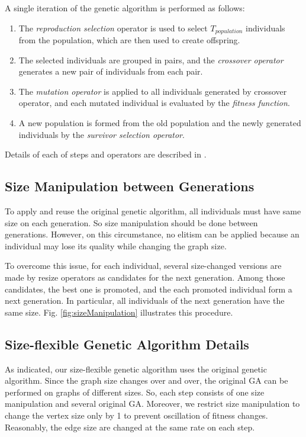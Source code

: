 \documentclass[a4paper, 10pt, conference]{ieeeconf}      %
\begin{document}
A single iteration of the genetic algorithm is performed as follows:

\begin{enumerate}
\item The \textit{reproduction selection} operator is used to select $T_{population}$ individuals from the population, which are then used to create offspring.
\item The selected individuals are grouped in pairs, and the \textit{crossover operator} generates a new pair of individuals from each pair.
\item The \textit{mutation operator} is applied to all individuals generated by crossover operator, and each mutated individual is evaluated by the \textit{fitness function}.
\item A new population is formed from the old population and the newly generated individuals by the \textit{survivor selection operator}.
\end{enumerate}

Details of each of steps and operators are described in \cite{c1}.

\subsection{Size Manipulation between Generations}
To apply and reuse the original genetic algorithm, all individuals must have same size on each generation. So size manipulation should be done between generations. However, on this circumstance, no elitism can be applied because an individual may lose its quality while changing the graph size.

To overcome this issue, for each individual, several size-changed versions are made by resize operators as candidates for the next generation. Among those candidates, the best one is promoted, and the each promoted individual form a next generation. In particular, all individuals of the next generation have the same size. Fig. \ref{fig:sizeManipulation} illustrates this procedure. 

\subsection{Size-flexible Genetic Algorithm Details}
As indicated, our size-flexible genetic algorithm uses the original genetic algorithm. Since the graph size changes over and over, the original GA can be performed on graphs of different sizes. So, each step consists of one size manipulation and several original GA. Moreover, we restrict size manipulation to change the vertex size only by 1 to prevent oscillation of fitness changes. Reasonably, the edge size are changed at the same rate on each step.
\end{document}
